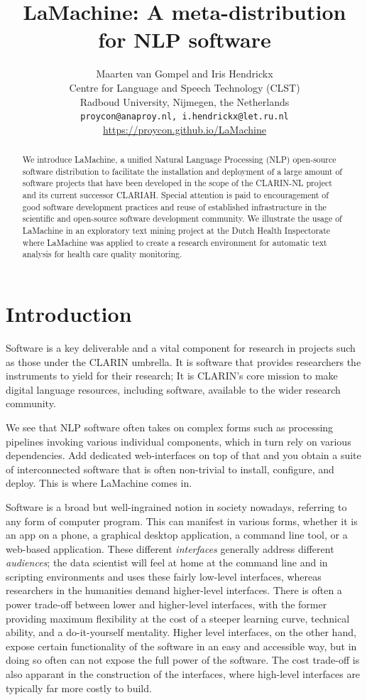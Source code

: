 \documentclass[a4paper,11pt]{article}
\title{LaMachine: A meta-distribution for NLP software}
\author{Maarten van Gompel  and Iris Hendrickx\\
  Centre for Language and Speech Technology (CLST) \\
  Radboud University, Nijmegen, the Netherlands \\
  {\tt proycon@anaproy.nl, i.hendrickx@let.ru.nl} \\ %
  \url{https://proycon.github.io/LaMachine}
}
\date{}
\begin{document}
\maketitle

\begin{abstract}
We introduce LaMachine, a unified Natural Language Processing (NLP) open-source software distribution to facilitate the
installation and deployment of a large amount of software projects that have been developed in the scope of the
CLARIN-NL project and its current successor CLARIAH. Special attention is paid to encouragement of good software
development practices and reuse of established infrastructure in the scientific and open-source software development
community. We illustrate the usage of LaMachine in an exploratory text mining project at the Dutch Health Inspectorate where LaMachine was applied to create a research environment for automatic text analysis for health care quality monitoring.
\end{abstract}

\section{Introduction} \label{intro}

Software is a key deliverable and a vital component for research in projects such as those under the CLARIN umbrella. It
is software that provides researchers the instruments to yield for their research; It is CLARIN's core mission to make
digital language resources, including software, available to the wider research community.

We see that NLP software often takes on complex forms such as processing pipelines invoking various individual
components, which in turn rely on various dependencies. Add dedicated web-interfaces on top of that and you obtain a
suite of interconnected software that is often non-trivial to install, configure, and deploy. This is where LaMachine
comes in.

Software is a broad but well-ingrained notion in society nowadays, referring to any form of computer program. This can
manifest in various forms, whether it is an app on a phone, a graphical desktop application, a command line tool, or a
web-based application. These different \emph{interfaces} generally address different \emph{audiences}; the data
scientist will feel at home at the command line and in scripting environments and uses these fairly low-level
interfaces, whereas researchers in the humanities demand higher-level interfaces. There is often a power trade-off
between lower and higher-level interfaces, with the former providing maximum flexibility at the cost of a steeper
learning curve, technical ability, and a do-it-yourself mentality. Higher level interfaces, on the other
hand, expose certain functionality of the software in an easy and accessible way, but in doing so often can not expose
the full power of the software. The cost trade-off is also apparant in the construction of the interfaces, where
high-level interfaces are typically far more costly to build.
\end{document}
